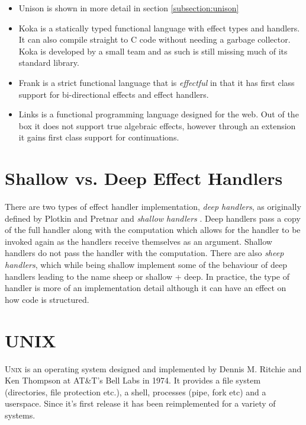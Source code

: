 \documentclass[logo,bsc,singlespacing,parskip]{infthesis}
\begin{document}
\begin{itemize}
        \item{Unison is shown in more detail in section \ref{subsection:unison}}
        \item{Koka \cite{DBLP:journals/corr/Leijen14} is a statically typed
functional language with effect types and handlers. It can also compile
straight to C code without needing a garbage collector. Koka is developed by a
small team and as such is still missing much of its standard library.}
        \item{Frank \cite{DBLP:conf/popl/LindleyMM17} is a strict functional
language that is \emph{effectful} in that it has first class support for
bi-directional effects and effect handlers. }
        \item{Links \cite{DBLP:conf/fmco/CooperLWY06} is a functional
programming language designed for the web. Out of the box it does not support
true algebraic effects, however through an extension
\cite{DBLP:conf/icfp/HillerstromL16} it gains first class support for
continuations.}
\end{itemize}

\section{Shallow vs. Deep Effect Handlers}

There are two types of effect handler implementation, \emph{deep handlers}, as
originally defined by Plotkin and Pretnar \cite{plotkin2009handlers} and
\emph{shallow handlers} \cite{hillerstrom2018shallow}. Deep handlers pass a
copy of the full handler along with the computation which allows for the
handler to be invoked again as the handlers receive themselves as an argument.
Shallow handlers do not pass the handler with the computation. There are also
\emph{sheep handlers}, which while being shallow implement some of the
behaviour of deep handlers leading to the name sheep or shallow + deep. In
practice, the type of handler is more of an implementation detail although it
can have an effect on how code is structured.

\section{\textsc{UNIX}}

\textsc{Unix} \cite{ritchie1978unix} is an operating system designed and
implemented by Dennis M. Ritchie and Ken Thompson at AT\&T's Bell Labs in 1974.
It provides a file system (directories, file protection etc.), a shell,
processes (pipe, fork etc) and a userspace. Since it's first release it has been
reimplemented for a variety of systems.
\end{document}
